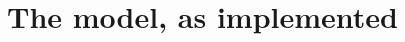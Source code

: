 \documentclass[final,1p,times]{elsarticle}
\begin{document}
\section{The model, as implemented}
\label{sec:model}



\end{document}
